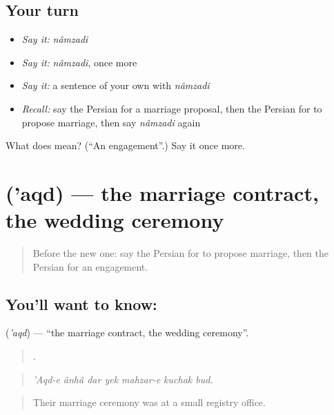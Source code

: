 \subsection*{Your turn}
\begin{itemize}
\raggedright
  \item \emph{Say it:} \emph{nâmzadi}
  \item \emph{Say it:} \emph{nâmzadi}, once more
  \item \emph{Say it:} a sentence of your own with \emph{nâmzadi}
  \item \emph{Recall:} say the Persian for a marriage proposal, then the Persian for to propose marriage, then say \emph{nâmzadi} again
\end{itemize}

\begin{tcolorbox}[breakable,colback=teal!4,colframe=teal!35!black,title={Before you move on}]
What does  mean? (\textquotedblleft{}An engagement\textquotedblright{}.) Say it once more.
\end{tcolorbox}
\section[\texorpdfstring{\fa{عقد} ('aqd)}{عقد ('aqd)}]{ ('aqd) — the marriage contract, the wedding ceremony}

\label{lesson:FA-C334-aqd}



\begin{quote}
Before the new one: say the Persian for to propose marriage, then the Persian for an engagement.
\end{quote}

\subsection*{You'll want to know: }
\textbf{} (\emph{'aqd}) — \textquotedblleft{}the marriage contract, the wedding ceremony\textquotedblright{}.

\begin{quote}
      .
\end{quote}

\begin{quote}
\emph{'Aqd-e ânhâ dar yek mahzar-e kuchak bud.}
\end{quote}

\begin{quote}
Their marriage ceremony was at a small registry office.
\end{quote}

